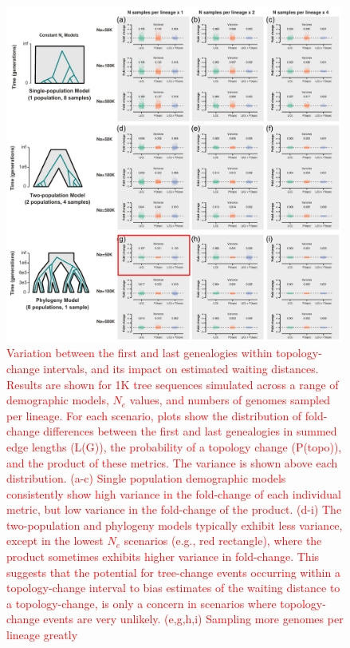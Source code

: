 \documentclass[11pt]{article}
\begin{document}
\begin{figure}[p]
	\centering
	\includegraphics[width=0.99\textwidth]{figures/current/FigS-bias-fold-topo-last-2.pdf}
	\caption{
		\textcolor{red}{
		Variation between the first and last genealogies within topology-change 
		intervals, and its impact on estimated waiting distances.
		Results are shown for 1K tree sequences simulated across a range of 
		demographic models, $N_e$ values, and numbers of genomes sampled per lineage.
		For each scenario, plots show the distribution of fold-change differences
		between the first and last genealogies in summed edge lengths (L(G)),
		the probability of a topology change (P(topo)), and the product of these
		metrics. The variance is shown above each distribution.
		(a-c) Single population demographic models consistently show high variance
		in the fold-change of each individual metric, but low variance in the
		fold-change of the product.
		(d-i) The two-population and phylogeny models typically exhibit less 
		variance, except in the lowest $N_e$ scenarios (e.g., red rectangle),
		where the product sometimes exhibits higher variance in fold-change.
		This suggests that the potential for tree-change events occurring within a 
		topology-change interval to bias estimates of the waiting distance to a
		topology-change, is only a concern in scenarios where topology-change events
		are very unlikely. (e,g,h,i) Sampling more genomes per lineage greatly 
}}
\end{figure}
\end{document}
